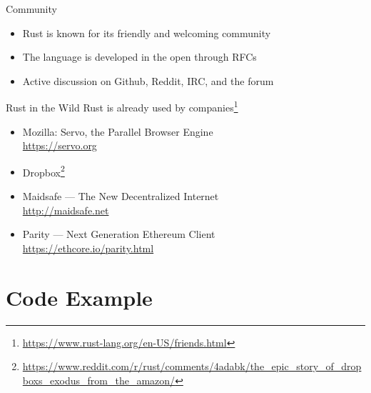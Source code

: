 \documentclass[aspectratio=1610,t]{beamer}
\begin{document}
\begin{frame}[c]{Community}
  \begin{itemize}
    \item Rust is known for its friendly and welcoming community
    \item The language is developed in the open through RFCs
    \item Active discussion on Github, Reddit, IRC, and the forum
  \end{itemize}
\end{frame}

\begin{frame}[c]{Rust in the Wild}
  Rust is already used by companies\footnote{\url{https://www.rust-lang.org/en-US/friends.html}}
  \begin{itemize}
    \item Mozilla: Servo, the Parallel Browser Engine\\
      {\footnotesize\url{https://servo.org}}
    \item Dropbox\footnote{\url{https://www.reddit.com/r/rust/comments/4adabk/the_epic_story_of_dropboxs_exodus_from_the_amazon/}}
    \item Maidsafe --- The New Decentralized Internet\\
      {\footnotesize\url{http://maidsafe.net}}
    \item Parity --- Next Generation Ethereum Client\\
      {\footnotesize\url{https://ethcore.io/parity.html}}
  \end{itemize}
\end{frame}


\section{Code Example}
\end{document}
